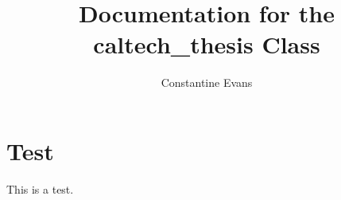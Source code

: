\documentclass{caltech_thesis}
\author{Constantine Evans}
\title{Documentation for the {caltech\_thesis} Class}
\begin{document}
\maketitle

\tableofcontents

\mainmatter

\chapter{Test}

This is a test.
\end{document}
